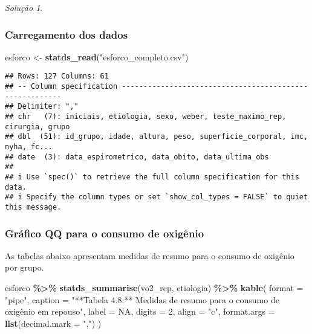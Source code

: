 \documentclass[
]{latex/krantz}
\newenvironment{Shaded}{\begin{snugshade}}{\end{snugshade}}
\newcommand{\AttributeTok}[1]{\textcolor[rgb]{0.13,0.29,0.53}{#1}}
\newcommand{\ConstantTok}[1]{\textcolor[rgb]{0.56,0.35,0.01}{#1}}
\newcommand{\DecValTok}[1]{\textcolor[rgb]{0.00,0.00,0.81}{#1}}
\newcommand{\FunctionTok}[1]{\textcolor[rgb]{0.13,0.29,0.53}{\textbf{#1}}}
\newcommand{\NormalTok}[1]{#1}
\newcommand{\OtherTok}[1]{\textcolor[rgb]{0.56,0.35,0.01}{#1}}
\newcommand{\SpecialCharTok}[1]{\textcolor[rgb]{0.81,0.36,0.00}{\textbf{#1}}}
\newcommand{\StringTok}[1]{\textcolor[rgb]{0.31,0.60,0.02}{#1}}
\theoremstyle{definition}
\theoremstyle{definition}
\theoremstyle{definition}
\theoremstyle{definition}
\theoremstyle{remark}
\newtheorem*{solution}{Solução}
\begin{document}
\begin{solution}
\leavevmode

\hypertarget{carregamento-dos-dados-1}{%
\subsubsection*{Carregamento dos dados}\label{carregamento-dos-dados-1}}

\begin{Shaded}
\begin{Highlighting}[]
\NormalTok{esforco }\OtherTok{\textless{}{-}} \FunctionTok{statds\_read}\NormalTok{(}\StringTok{"esforco\_completo.csv"}\NormalTok{)}
\end{Highlighting}
\end{Shaded}

\begin{verbatim}
## Rows: 127 Columns: 61
## -- Column specification --------------------------------------------------------
## Delimiter: ","
## chr   (7): iniciais, etiologia, sexo, weber, teste_maximo_rep, cirurgia, grupo
## dbl  (51): id_grupo, idade, altura, peso, superficie_corporal, imc, nyha, fc...
## date  (3): data_espirometrico, data_obito, data_ultima_obs
## 
## i Use `spec()` to retrieve the full column specification for this data.
## i Specify the column types or set `show_col_types = FALSE` to quiet this message.
\end{verbatim}

\hypertarget{gruxe1fico-qq-para-o-consumo-de-oxiguxeanio}{%
\subsubsection{Gráfico QQ para o consumo de oxigênio}\label{gruxe1fico-qq-para-o-consumo-de-oxiguxeanio}}

As tabelas abaixo apresentam medidas de resumo para o consumo de oxigênio por grupo.

\begin{Shaded}
\begin{Highlighting}[]
\NormalTok{esforco }\SpecialCharTok{\%\textgreater{}\%}
  \FunctionTok{statds\_summarise}\NormalTok{(vo2\_rep, etiologia) }\SpecialCharTok{\%\textgreater{}\%}
  \FunctionTok{kable}\NormalTok{(}
    \AttributeTok{format =} \StringTok{"pipe"}\NormalTok{,}
    \AttributeTok{caption =} \StringTok{"**Tabela 4.8:** Medidas de resumo para o consumo de oxigênio em repouso"}\NormalTok{,}
    \AttributeTok{label =} \ConstantTok{NA}\NormalTok{,}
    \AttributeTok{digits =} \DecValTok{2}\NormalTok{,}
    \AttributeTok{align =} \StringTok{"c"}\NormalTok{,}
    \AttributeTok{format.args =} \FunctionTok{list}\NormalTok{(}\AttributeTok{decimal.mark =} \StringTok{","}\NormalTok{)}
\NormalTok{  )}
\end{Highlighting}
\end{Shaded}


\end{solution}
\end{document}
